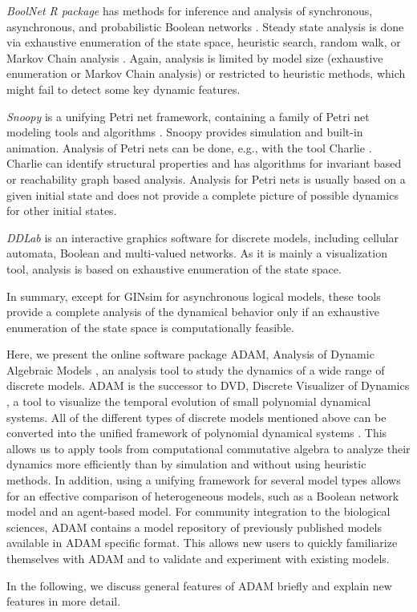\documentclass[10pt]{bmc_article}
\begin{document}
{\it BoolNet R package} has methods for inference and analysis of synchronous, asynchronous, and probabilistic Boolean networks \cite{boolnet}. Steady state analysis is done via exhaustive enumeration of the state space, heuristic search, random walk, or Markov Chain analysis \cite{shmulevich}. Again, analysis is limited by model size (exhaustive enumeration or Markov Chain analysis) or restricted to heuristic methods, which might fail to detect some key dynamic features.


{\it Snoopy} is a unifying Petri net framework, containing a family of Petri net modeling tools and algorithms \cite{Snoopy}. Snoopy provides simulation and built-in animation. Analysis of Petri nets can be done, e.g., with the tool Charlie \cite{Charlie}. Charlie can identify structural properties and has algorithms for invariant based or reachability graph based analysis. Analysis for Petri nets is usually based on a given initial state and does not provide a complete picture of possible dynamics for other initial states.

{\it DDLab} is an interactive graphics software for discrete models, including cellular automata, Boolean and multi-valued networks. As it is mainly a visualization tool, analysis is based on exhaustive enumeration of the state space.



In summary, except for GINsim for asynchronous logical models, these tools provide a complete analysis of the dynamical behavior only if an exhaustive enumeration of the state space is computationally feasible. 




Here, we present the online software package ADAM, Analysis of Dynamic Algebraic Models \cite{ADAM}, an analysis tool to study the dynamics of a wide range of discrete models. ADAM is the successor to DVD, Discrete Visualizer of Dynamics \cite{DVD}, a tool to visualize the temporal evolution of small polynomial dynamical systems. All of the different types of discrete models mentioned above can be
converted into the unified framework of polynomial dynamical systems
\cite{Alan:Bioinf2010, Hinkelmann:2010}. This allows us to apply tools from
computational commutative algebra to analyze their dynamics more efficiently than by simulation and without using heuristic methods. In addition, using a unifying framework for several model types
allows for an effective comparison of heterogeneous models, such as a Boolean network model and an agent-based model.
For community integration to the biological sciences, ADAM contains a model repository of  previously published models available in ADAM specific format. This allows new users to quickly familiarize themselves with ADAM and to validate and experiment with existing models.

In the following, we discuss general features of ADAM briefly and explain new features in more detail.
\end{document}
